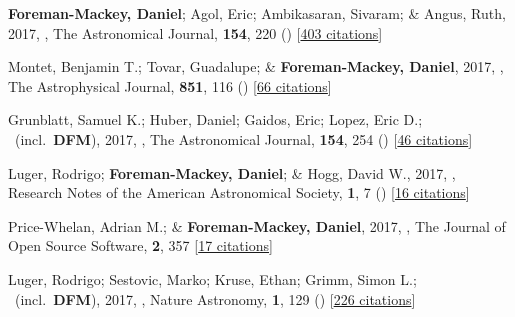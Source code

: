 \item[{\color{numcolor}\scriptsize31}] \textbf{Foreman-Mackey, Daniel}; Agol, Eric; Ambikasaran, Sivaram; \& Angus, Ruth, 2017, , The Astronomical Journal, \textbf{154}, 220 () [\href{https://ui.adsabs.harvard.edu/abs/2017AJ....154..220F}{403 citations}]

\item[{\color{numcolor}\scriptsize30}] Montet, Benjamin T.; Tovar, Guadalupe; \& \textbf{Foreman-Mackey, Daniel}, 2017, , The Astrophysical Journal, \textbf{851}, 116 () [\href{https://ui.adsabs.harvard.edu/abs/2017ApJ...851..116M}{66 citations}]

\item[{\color{numcolor}\scriptsize29}] Grunblatt, Samuel K.; Huber, Daniel; Gaidos, Eric; Lopez, Eric D.; \etal\ (incl.\ \textbf{DFM}), 2017, , The Astronomical Journal, \textbf{154}, 254 () [\href{https://ui.adsabs.harvard.edu/abs/2017AJ....154..254G}{46 citations}]

\item[{\color{numcolor}\scriptsize28}] Luger, Rodrigo; \textbf{Foreman-Mackey, Daniel}; \& Hogg, David W., 2017, , Research Notes of the American Astronomical Society, \textbf{1}, 7 () [\href{https://ui.adsabs.harvard.edu/abs/2017RNAAS...1....7L}{16 citations}]

\item[{\color{numcolor}\scriptsize27}] Price-Whelan, Adrian M.; \& \textbf{Foreman-Mackey, Daniel}, 2017, , The Journal of Open Source Software, \textbf{2}, 357 [\href{https://ui.adsabs.harvard.edu/abs/2017JOSS....2..357P}{17 citations}]

\item[{\color{numcolor}\scriptsize26}] Luger, Rodrigo; Sestovic, Marko; Kruse, Ethan; Grimm, Simon L.; \etal\ (incl.\ \textbf{DFM}), 2017, , Nature Astronomy, \textbf{1}, 129 () [\href{https://ui.adsabs.harvard.edu/abs/2017NatAs...1E.129L}{226 citations}]

